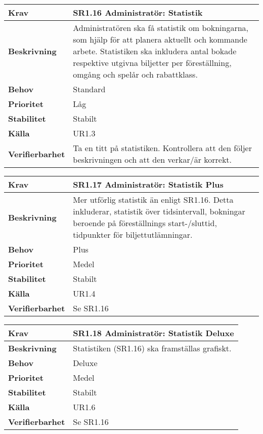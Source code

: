 \documentclass[a4paper, twoside, 11pt, titlepage]{article}
\begin{document}
		\begin{tabular} { p{2.6cm} p{12.5cm} }
			\hline
			\sffamily\textbf{Krav} & \sffamily\textbf{SR1.16 Administratör: Statistik } \\
			\hline
			\sffamily\textbf{Beskrivning} & Administratören ska få statistik om bokningarna, som hjälp för att planera aktuellt och kommande arbete. Statistiken ska inkludera antal bokade respektive utgivna biljetter per föreställning, omgång och spelår och rabattklass.  \\
			\hline
			\sffamily\textbf{Behov} & Standard  \\
			\hline
			\sffamily\textbf{Prioritet} & Låg  \\
			\hline
			\sffamily\textbf{Stabilitet} & Stabilt  \\
			\hline
			\sffamily\textbf{Källa} & UR1.3  \\
			\hline
			\sffamily\textbf{Verifierbarhet} & Ta en titt på statistiken. Kontrollera att den följer beskrivningen och att den verkar/är korrekt.  \\
			\hline
		\end{tabular}
		\vspace{6mm}

		\begin{tabular} { p{2.6cm} p{12.5cm} }
			\hline
			\sffamily\textbf{Krav} & \sffamily\textbf{SR1.17 Administratör: Statistik Plus } \\
			\hline
			\sffamily\textbf{Beskrivning} & Mer utförlig statistik än enligt SR1.16. Detta inkluderar, statistik över tidsintervall, bokningar beroende på föreställnings start-/sluttid, tidpunkter för biljettutlämningar.  \\
			\hline
			\sffamily\textbf{Behov} & Plus  \\
			\hline
			\sffamily\textbf{Prioritet} & Medel  \\
			\hline
			\sffamily\textbf{Stabilitet} & Stabilt  \\
			\hline
			\sffamily\textbf{Källa} & UR1.4  \\
			\hline
			\sffamily\textbf{Verifierbarhet} & Se SR1.16  \\
			\hline
		\end{tabular}
		\vspace{6mm}

		\begin{tabular} { p{2.6cm} p{12.5cm} }
			\hline
			\sffamily\textbf{Krav} & \sffamily\textbf{SR1.18 Administratör: Statistik Deluxe } \\
			\hline
			\sffamily\textbf{Beskrivning} & Statistiken (SR1.16) ska framställas grafiskt.  \\
			\hline
			\sffamily\textbf{Behov} & Deluxe  \\
			\hline
			\sffamily\textbf{Prioritet} & Medel  \\
			\hline
			\sffamily\textbf{Stabilitet} & Stabilt  \\
			\hline
			\sffamily\textbf{Källa} & UR1.6  \\
			\hline
			\sffamily\textbf{Verifierbarhet} & Se SR1.16  \\
			\hline
		\end{tabular}
\end{document}
